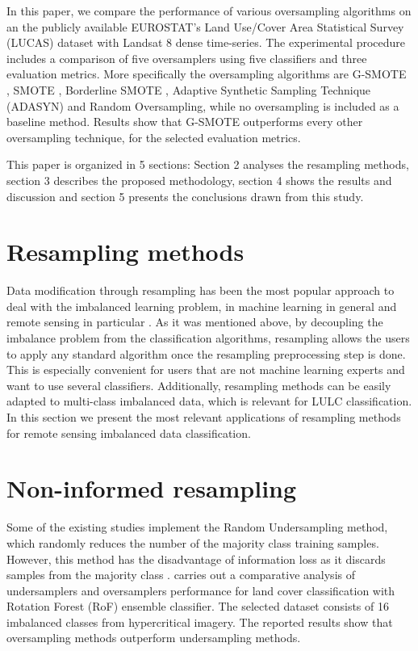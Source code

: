 \documentclass[remotesensing,article,submit,moreauthors,pdftex]{Definitions/mdpi}
\begin{document}
In this paper, we compare the performance of various oversampling algorithms on
an the publicly available EUROSTAT's Land Use/Cover Area Statistical Survey
(LUCAS) dataset \cite{LUCAS2015} with Landsat 8 dense time-series. The
experimental procedure includes a comparison of five oversamplers using five
classifiers and three evaluation metrics. More specifically the oversampling
algorithms are G-SMOTE \cite{Douzas2019}, SMOTE \cite{Chawla2002}, Borderline
SMOTE \cite{Han2005}, Adaptive Synthetic Sampling Technique (ADASYN)
\cite{HaiboHe2008} and Random Oversampling, while no oversampling is included as
a baseline method. Results show that G-SMOTE outperforms every other
oversampling technique, for the selected evaluation metrics.

This paper is organized in 5 sections: Section 2 analyses the resampling methods,
section 3 describes the proposed methodology, section 4 shows the results and
discussion and section 5 presents the conclusions drawn from this study.

\section{Resampling methods}

Data modification through resampling has been the most popular approach to deal
with the imbalanced learning problem, in machine learning in general and remote
sensing in particular \cite{Feng2019}. As it was mentioned above, by decoupling
the imbalance problem from the classification algorithms, resampling allows the
users to apply any standard algorithm once the resampling preprocessing step is
done. This is especially convenient for users that are not machine learning
experts and want to use several classifiers. Additionally, resampling methods
can be easily adapted to multi-class imbalanced data, which is relevant for LULC
classification. In this section we present the most relevant applications of
resampling methods for remote sensing imbalanced data classification.

\section{Non-informed resampling}

Some of the existing studies implement the Random Undersampling method, which
randomly reduces the number of the majority class training samples.
However, this method has the disadvantage of information loss as it discards
samples from the majority class \cite{Feng2019}. \cite{Feng2018} carries out a
comparative analysis of undersamplers and oversamplers performance for land
cover classification with Rotation Forest (RoF) ensemble classifier. The
selected dataset consists of 16 imbalanced classes from hypercritical imagery.
The reported results show that oversampling methods outperform undersampling methods.
\end{document}

